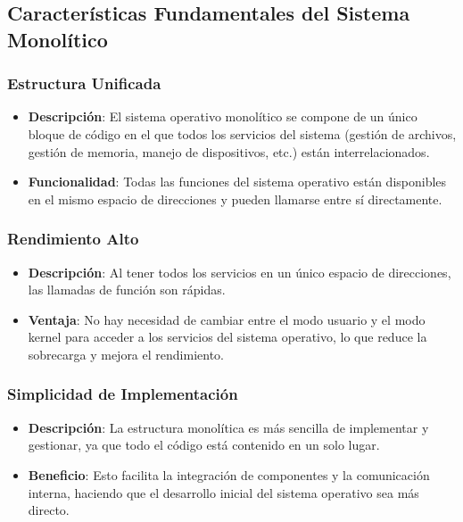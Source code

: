 \subsection{Características Fundamentales del Sistema Monolítico}
\begin{tcolorbox}

\subsubsection{Estructura Unificada}
\begin{itemize}
	\item \textbf{Descripción}: El sistema operativo monolítico se compone de un único bloque de código en el que todos los servicios del sistema (gestión de archivos, gestión de memoria, manejo de dispositivos, etc.) están interrelacionados.
	\item \textbf{Funcionalidad}: Todas las funciones del sistema operativo están disponibles en el mismo espacio de direcciones y pueden llamarse entre sí directamente.
\end{itemize}
	
\end{tcolorbox}


\begin{tcolorbox}


\subsubsection{Rendimiento Alto}
\begin{itemize}
	\item \textbf{Descripción}: Al tener todos los servicios en un único espacio de direcciones, las llamadas de función son rápidas.
	\item \textbf{Ventaja}: No hay necesidad de cambiar entre el modo usuario y el modo kernel para acceder a los servicios del sistema operativo, lo que reduce la sobrecarga y mejora el rendimiento.
\end{itemize}
\end{tcolorbox}

\begin{tcolorbox}

\subsubsection{Simplicidad de Implementación}
\begin{itemize}
	\item \textbf{Descripción}: La estructura monolítica es más sencilla de implementar y gestionar, ya que todo el código está contenido en un solo lugar.
	\item \textbf{Beneficio}: Esto facilita la integración de componentes y la comunicación interna, haciendo que el desarrollo inicial del sistema operativo sea más directo.
\end{itemize}

\end{tcolorbox}



